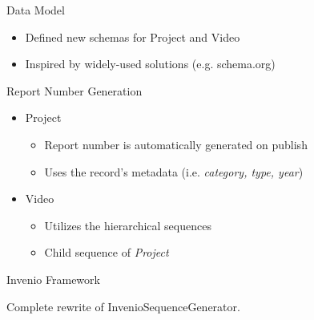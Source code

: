 \documentclass{beamer}
\newcommand{\contrib}[1]{
  \vfill
  \begin{alertblock}{Invenio Framework}
    #1
  \end{alertblock}
}
\begin{document}
  	\begin{frame}{Data Model}
    	\begin{itemize}
    	  \item{Defined new schemas for \alert{Project} and \alert{Video}}
   	  \item{Inspired by widely-used solutions (e.g. schema.org)}
	  \end{itemize}
	\end{frame}
	
	\begin{frame}{Report Number Generation}
	  \begin{itemize}	  
    	  \item{\alert{Project}}
      	\begin{itemize}
      	  \item{Report number is automatically generated on publish}
      	  \item{Uses the record's metadata (i.e. \emph{category, type, year})}
    	  \end{itemize}
    	  \item{\alert{Video}}
      	\begin{itemize}
      	  \item{Utilizes the hierarchical sequences}
      	  \item{Child sequence of \emph{Project}}
    	  \end{itemize}
  	  \end{itemize}

  	   \contrib{
		  Complete rewrite of \alert{InvenioSequenceGenerator}.
		}    	
	\end{frame}
\end{document}
